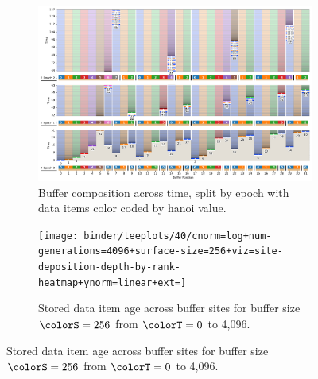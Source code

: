 \begin{figure}[h!]
  \centering

\begin{subfigure}[b]{\linewidth}
\includegraphics[width=\linewidth]{
binder/teeplots/40/num-generations=128+surface-size=32+viz=site-reservation-by-rank-spliced-at-heatmap+ext=}
\vspace{-4ex}\caption{
  Buffer composition across time, split by epoch with data items color coded by hanoi value.
}
\label{fig:hsurf-stretched-implementation-schematic}
\end{subfigure}

\vspace{1ex}\begin{minipage}[]{\textwidth}
 \vspace{-2pt}
  \begin{subfigure}[t]{0.7\linewidth}
    \vspace{0pt}
    \centering
  \texttt{[image: binder/teeplots/40/cnorm=log+num-generations=4096+surface-size=256+viz=site-deposition-depth-by-rank-heatmap+ynorm=linear+ext=]}
  \end{subfigure}%
  \begin{subfigure}[t]{0.3\linewidth}
  \vspace{-2pt}
  \caption{%
    Stored data item age across buffer sites for buffer size $\colorS=256$ from $\colorT=0$ to 4,096.
  }
  \label{fig:hsurf-stretched-implementation-heatmap}
\end{subfigure}
\end{minipage}


\end{figure}
